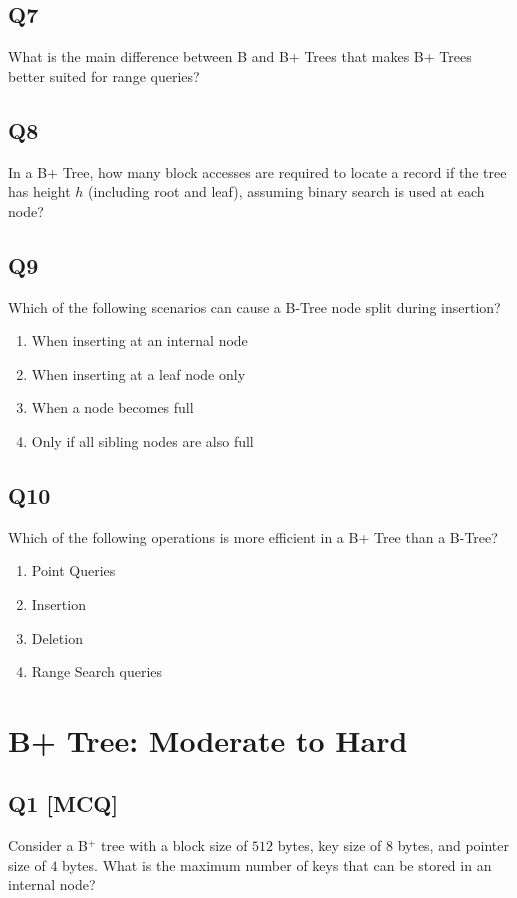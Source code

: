 \subsection*{Q7}
What is the main difference between B and B+ Trees that makes B+ Trees better suited for range queries?

\subsection*{Q8}
In a B+ Tree, how many block accesses are required to locate a record if the tree has height $h$ (including root and leaf), assuming binary search is used at each node?

\subsection*{Q9}
Which of the following scenarios can cause a B-Tree node split during insertion?  
\begin{enumerate}[label=(\alph*)]
    \item When inserting at an internal node  
    \item When inserting at a leaf node only
    \item When a node becomes full  
    \item Only if all sibling nodes are also full
\end{enumerate}


\subsection*{Q10}
Which of the following operations is more efficient in a B+ Tree than a B-Tree?  

\begin{enumerate}[label=(\alph*)]
    \item Point Queries
    \item Insertion
    \item Deletion
    \item Range Search queries
\end{enumerate}


\section{B+ Tree: Moderate to Hard}

\subsection*{Q1 [MCQ]}
Consider a B$^+$ tree with a block size of $512$ bytes, key size of $8$ bytes, and pointer size of $4$ bytes. What is the maximum number of keys that can be stored in an internal node?

